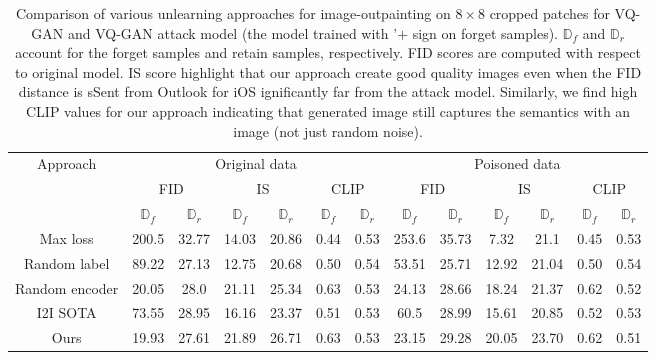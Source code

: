 \begin{table*}[h]
    \centering
    \begin{tabular}{ccccccc||cccccc}
      \toprule
      \multirow{3}{*}{Approach} & \multicolumn{6}{c||}{Original data} & \multicolumn{6}{c}{Poisoned data} \\
      & \multicolumn{2}{c}{FID} & \multicolumn{2}{c}{IS} & \multicolumn{2}{c||}{CLIP} & \multicolumn{2}{c}{FID} & \multicolumn{2}{c}{IS} & \multicolumn{2}{c}{CLIP} \\ \cline{2-13}
      & $\mathbb{D}_f$ & $\mathbb{D}_r$ & $\mathbb{D}_f$ & $\mathbb{D}_r$ & $\mathbb{D}_f$ & $\mathbb{D}_r$ & $\mathbb{D}_f$ & $\mathbb{D}_r$ & $\mathbb{D}_f$ & $\mathbb{D}_r$ & $\mathbb{D}_f$ & $\mathbb{D}_r$ \\
      \hline
      Max loss & 200.5 & 32.77 & 14.03 & 20.86 & 0.44 & 0.53 & 253.6 & 35.73 & 7.32 & 21.1 & 0.45 & 0.53 \\
      Random label & 89.22 & 27.13 & 12.75 & 20.68 & 0.50 & 0.54 & 53.51 & 25.71 & 12.92 & 21.04 & 0.50 & 0.54\\
      Random encoder & 20.05 & 28.0 & 21.11 & 25.34 & 0.63 & 0.53 & 24.13 & 28.66 & 18.24 & 21.37 & 0.62 & 0.52 \\
      I2I SOTA & 73.55 & 28.95 & 16.16 & 23.37 & 0.51 & 0.53 & 60.5 & 28.99 & 15.61 & 20.85 & 0.52 & 0.53 \\
      Ours & 19.93 & 27.61 & 21.89 & 26.71 & 0.63 & 0.53 & 23.15 & 29.28 & 20.05 & 23.70 & 0.62 & 0.51 \\
      \bottomrule
    \end{tabular}
    \caption{Comparison of various unlearning approaches  for image-outpainting on $8\times8 $ cropped patches for VQ-GAN and VQ-GAN attack model (the model trained with '$+$ sign on forget samples). $\mathbb{D}_f$ and $\mathbb{D}_r$ account for the forget samples and retain samples, respectively. FID scores are computed with respect to original model. IS score highlight that our approach create good quality images even when the FID distance is sSent from Outlook for iOS
ignificantly far from the attack model. Similarly, we find high CLIP values for our approach indicating that generated image still captures the semantics with an image (not just random noise).}
    \label{tab:VQ-GAN_results_outpaint8x8original}
\end{table*}
